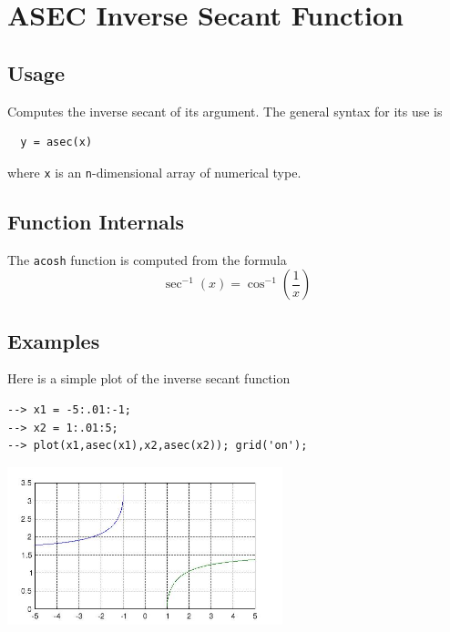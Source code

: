 \section{ASEC Inverse Secant Function}

\subsection{Usage}

Computes the inverse secant of its argument.  The general
syntax for its use is
\begin{verbatim}
  y = asec(x)
\end{verbatim}
where \verb|x| is an \verb|n|-dimensional array of numerical type.
\subsection{Function Internals}

The \verb|acosh| function is computed from the formula
\[
   \sec^{-1}(x) = \cos^{-1}\left(\frac{1}{x}\right)
\]
\subsection{Examples}

Here is a simple plot of the inverse secant function
\begin{verbatim}
--> x1 = -5:.01:-1;
--> x2 = 1:.01:5;
--> plot(x1,asec(x1),x2,asec(x2)); grid('on');
\end{verbatim}


\centerline{\includegraphics[width=8cm]{asecplot}}

